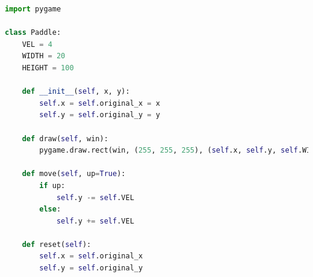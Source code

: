 \documentclass[10pt]{article}
\begin{document}
\begin{lstlisting}[language=Python, caption=paddle.py code]
import pygame

class Paddle:
    VEL = 4
    WIDTH = 20
    HEIGHT = 100

    def __init__(self, x, y):
        self.x = self.original_x = x
        self.y = self.original_y = y

    def draw(self, win):
        pygame.draw.rect(win, (255, 255, 255), (self.x, self.y, self.WIDTH, self.HEIGHT))

    def move(self, up=True):
        if up:
            self.y -= self.VEL
        else:
            self.y += self.VEL

    def reset(self):
        self.x = self.original_x
        self.y = self.original_y
\end{lstlisting}
\end{document}
